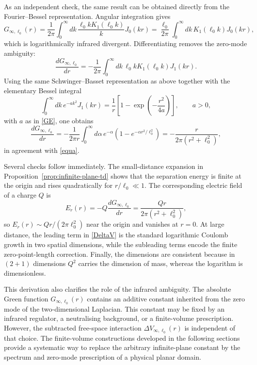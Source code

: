 \documentclass[nopacs,amsmath,amsfonts,amssymb,aps,superscriptaddress]{revtex4}
\begin{document}
As an independent check, the same result can be obtained directly from the Fourier--Bessel representation. Angular integration gives
\begin{equation}
  G_{\infty,\ell_0}(r)
  =\frac{1}{2\pi}\int_0^\infty dk\,\frac{\ell_0 kK_1(\ell_0 k)}{k}J_0(kr)
  =\frac{\ell_0}{2\pi}\int_0^\infty dk\,K_1(\ell_0 k)J_0(kr),
\end{equation}
which is logarithmically infrared divergent. Differentiating removes the zero-mode ambiguity:
\begin{equation}
  \frac{dG_{\infty,\ell_0}}{dr}
  =-\frac{1}{2\pi}\int_0^\infty dk\,\ell_0 kK_1(\ell_0 k)J_1(kr).
\end{equation}
Using the same Schwinger--Basset representation as above together with the elementary Bessel integral \cite{GradshteynRyzhik2014}
\begin{equation}
  \int_0^\infty dk\,e^{-ak^2}J_1(kr)
  =\frac{1}{r}\left[1-\exp\left(-\frac{r^2}{4a}\right)\right],
  \qquad a>0,
\end{equation}
with $a$ as in \eqref{GE}, one obtains
\begin{equation}
  \frac{dG_{\infty,\ell_0}}{dr}
  =-\frac{1}{2\pi r}\int_0^\infty d\alpha\,e^{-\alpha}
  \left(1-e^{-\alpha r^2/\ell_0^2}\right)
  =-\frac{r}{2\pi(r^2+\ell_0^2)},
\end{equation}
in agreement with \eqref{equa}.

Several checks follow immediately. The small-distance expansion in Proposition~\ref{prop:infinite-plane-td} shows that the separation energy is finite at the origin and rises quadratically for $r/\ell_0\ll 1$. The corresponding electric field of a charge $Q$ is
\begin{equation}
  E_r(r)=-Q\frac{dG_{\infty,\ell_0}}{dr}
  =\frac{Qr}{2\pi(r^2+\ell_0^2)},
\end{equation}
so $E_r(r)\sim Qr/(2\pi\ell_0^2)$ near the origin and vanishes at $r=0$. At large distance, the leading term in \eqref{DeltaV} is the standard logarithmic Coulomb growth in two spatial dimensions, while the subleading terms encode the finite zero-point-length correction. Finally, the dimensions are consistent because in $(2+1)$ dimensions $Q^2$ carries the dimension of mass, whereas the logarithm is dimensionless.

This derivation also clarifies the role of the infrared ambiguity. The absolute Green function $G_{\infty,\ell_0}(r)$ contains an additive constant inherited from the zero mode of the two-dimensional Laplacian. This constant may be fixed by an infrared regulator, a neutralising background, or a finite-volume prescription. However, the subtracted free-space interaction $\Delta V_{\infty,\ell_0}(r)$ is independent of that choice. The finite-volume constructions developed in the following sections provide a systematic way to replace the arbitrary infinite-plane constant by the spectrum and zero-mode prescription of a physical planar domain.
\end{document}
